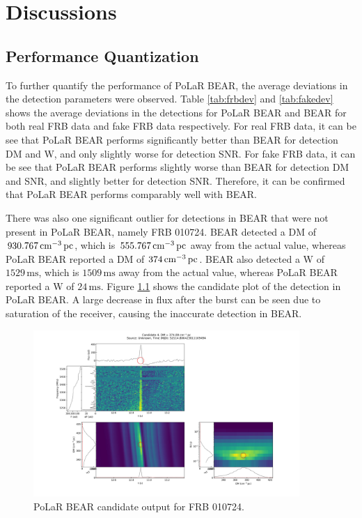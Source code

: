 \chapter{Discussions}\label{discuss}

\section{Performance Quantization}

To further quantify the performance of PoLaR BEAR, the average deviations in the detection parameters were observed. Table \ref{tab:frbdev} and \ref{tab:fakedev} shows the average deviations in the detections for PoLaR BEAR and BEAR for both real FRB data and fake FRB data respectively. For real FRB data, it can be see that PoLaR BEAR performs significantly better than BEAR for detection DM and W, and only slightly worse for detection SNR. For fake FRB data, it can be see that PoLaR BEAR performs slightly worse than BEAR for detection DM and SNR, and slightly better for detection SNR. Therefore, it can be confirmed that PoLaR BEAR performs comparably well with BEAR.




There was also one significant outlier for detections in BEAR that were not present in PoLaR BEAR, namely FRB 010724. BEAR detected a DM of $930.767 \,\text{cm}^{-3}\,\text{pc}$, which is $555.767 \,\text{cm}^{-3}\,\text{pc}$ away from the actual value, whereas PoLaR BEAR reported a DM of $374 \,\text{cm}^{-3}\,\text{pc}$. BEAR also detected a W of $1529\,\text{ms}$, which is $1509\,\text{ms}$ away from the actual value, whereas PoLaR BEAR reported a W of $24\,\text{ms}$. Figure \ref{fig:frb010724} shows the candidate plot of the detection in PoLaR BEAR. A large decrease in flux after the burst can be seen due to saturation of the receiver, causing the inaccurate detection in BEAR. 

\begin{figure}
    \centering
    \includegraphics[width=0.9\textwidth]{Images/FRB010724.jpeg}
    \caption{PoLaR BEAR candidate output for FRB 010724.}
    \label{fig:frb010724}
\end{figure}

